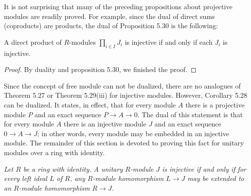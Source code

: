 It is not surprising that many of the preceding propositions about projective modules are readily proved. For example, since the dual of direct sums (coproducts) are products, the dual of Proposition 5.30 is the following:
\begin{proposition}
A direct product of $R$-modules $\prod_{i\in I}J_i$ is injective if and only if each $J_i$ is injective.
\end{proposition}
\begin{proof}
By duality and proposition 5.30, we finished the proof.
\end{proof}
Since the concept of free module can not be dualized, there are no analogues of Theorem 5.27 or Theorem 5.29(iii) for injective modules. However, Corollary 5.28 can be dualized. It states, in effect, that for every module $A$ there is a projective module $P$ and an exact sequence $P\longrightarrow A\longrightarrow 0$. The dual of this statement is that for every module $A$ there is an injective module $J$ and an exact sequence $0\longrightarrow A\longrightarrow J$; in other words, every module may be embedded in an injective module. The remainder of this section is devoted to proving this fact for unitary modules over a ring with identity.
\begin{lemma}\em
Let $R$ be a ring with identity. A unitary $R$-module $J$ is injective if and only if for every left ideal $L$ of $R$, any $R$-module homomorphism $L\to J$ may be extended to an $R$-module homomorphism $R\to J$.
\end{lemma}
